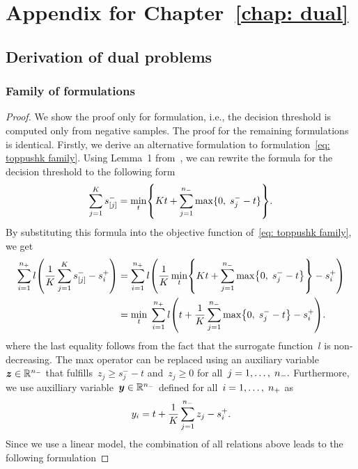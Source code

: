 \chapter{Appendix for Chapter~\ref{chap: dual}}\label{app: dual}

\section{Derivation of dual problems}

\subsection{Family of \TopPushK formulations}

\topdual*
\begin{proof}
  We show the proof only for \TopPushK formulation, i.e., the decision threshold is computed only from negative samples. The proof for the remaining formulations is identical. Firstly, we derive an alternative formulation to formulation~\eqref{eq: toppushk family}. Using Lemma~1 from~\cite{ogryczak2003minimizing}, we can rewrite the formula for the decision threshold to the following form
  \begin{equation*}
    \sum_{j = 1}^{K} s^-_{[j]} = \min_{t} \Brac[c]{Kt + \sum_{j = 1}^{\nneg} \max\{0, \; s^-_j - t\}}.
  \end{equation*}
  By substituting this formula into the objective function of~\eqref{eq: toppushk family}, we get
  \begin{align*}
    \sum_{i = 1}^{\npos} l\Brac{\frac{1}{K}\sum_{j = 1}^{K} s^-_{[j]} - s^+_{i}}
      & = \sum_{i = 1}^{\npos} l\Brac{ \frac{1}{K} \min_{t} \Brac[c]{Kt + \sum_{j = 1}^{\nneg} \max\Brac[c]{0, \; s^-_j - t}} - s^+_{i}} \\
      & = \min_{t} \; \sum_{i = 1}^{\npos} l\Brac{t + \frac{1}{K} \sum_{j = 1}^{\nneg} \max\Brac[c]{0, \; s^-_j - t} - s^+_{i}}.
  \end{align*}
  where the last equality follows from the fact that the surrogate function~$l$ is non-decreasing. The max operator can be replaced using an auxiliary variable~$\bm{z} \in \mathbb{R}^{n_{-}}$ that fulfills~$z _j \geq s^-_j - t$ and~$z _j \geq 0$ for all~$j = 1, \ldots, \; n_{-}.$ Furthermore, we use auxilliary variable~$\bm{y} \in \mathbb{R}^{n_{-}}$ defined for all~$i = 1, \ldots, \; n_{+}$ as
  \begin{equation*}
    y_i = t + \frac{1}{K} \sum_{j = 1}^{n_{-}} z_j - s^+_i.
  \end{equation*}
  Since we use a linear model, the combination of all relations above leads to the following formulation

\end{proof}
